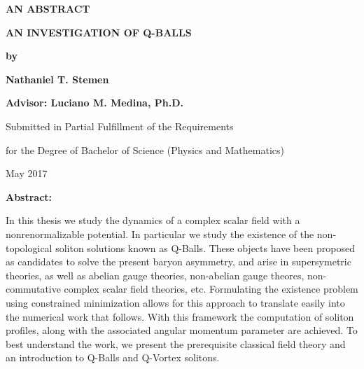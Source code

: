 \documentclass[12pt]{report}
\theoremstyle{definition}
\begin{document}
\begin{center}
\begin{minipage}{\linewidth}
    \centering
    \textbf{AN ABSTRACT} \\ \vspace{1.cm}
    
    \textbf{AN INVESTIGATION OF Q-BALLS} \\ \vspace{0.5cm}
    
    \textbf{by} \\ \vspace{0.75cm}
    
    \textbf{Nathaniel T. Stemen} \\ \vspace{0.75cm}
    
    \textbf{Advisor: Luciano M. Medina, Ph.D.}\\ \vspace{1.cm}
    
    {Submitted in Partial Fulfillment of the Requirements} \\ \vspace{0.5cm}
    
    {for the Degree of Bachelor of Science (Physics and Mathematics)} \\ \vspace{1.cm}
    
    {May 2017} \\ \vspace{0.5cm}
    
    {\textbf{Abstract:}}
    
    {In this thesis we study the dynamics of a complex scalar field with a nonrenormalizable potential. In particular we study the existence of the non-topological soliton solutions known as Q-Balls. These objects have been proposed as candidates to solve the present baryon asymmetry, and arise in supersymetric theories, as well as abelian gauge theories, non-abelian gauge theores, non-commutative complex scalar field theories, etc. Formulating the existence problem using constrained minimization allows for this approach to translate easily into the numerical work that follows. With this framework the computation of soliton profiles, along with the associated angular momentum parameter are achieved. To best understand the work, we present the prerequisite classical field theory and an introduction to Q-Balls and Q-Vortex solitons.}
\end{minipage}
\end{center}
\clearpage
\end{document}
